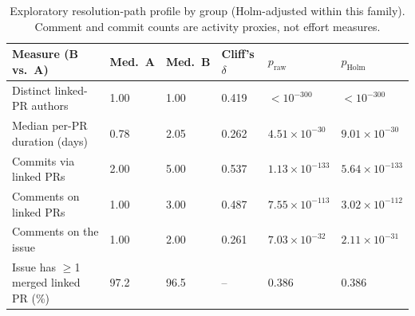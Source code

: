 \begin{table}[t]
\centering
\caption{Exploratory resolution-path profile by group (Holm-adjusted within this family). Comment and commit counts are activity proxies, not effort measures.\label{tab:exploratory}}
\small \begin{tabular}{@{}llllll@{}}
\toprule
Measure (B vs.\ A) & Med.\ A & Med.\ B & Cliff's $\delta$ & $p_{\text{raw}}$ & $p_{\text{Holm}}$ \\\midrule
Distinct linked-PR authors & 1.00 & 1.00 & 0.419 & $<10^{-300}$ & $<10^{-300}$ \\
Median per-PR duration (days) & 0.78 & 2.05 & 0.262 & $4.51\times 10^{-30}$ & $9.01\times 10^{-30}$ \\
Commits via linked PRs & 2.00 & 5.00 & 0.537 & $1.13\times 10^{-133}$ & $5.64\times 10^{-133}$ \\
Comments on linked PRs & 1.00 & 3.00 & 0.487 & $7.55\times 10^{-113}$ & $3.02\times 10^{-112}$ \\
Comments on the issue & 1.00 & 2.00 & 0.261 & $7.03\times 10^{-32}$ & $2.11\times 10^{-31}$ \\
Issue has $\geq$1 merged linked PR (\%) & 97.2 & 96.5 & -- & $0.386$ & $0.386$ \\
\bottomrule
\end{tabular}
\end{table}
